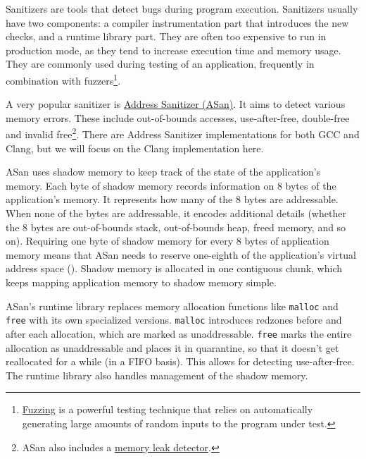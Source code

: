 \documentclass[
  a4paper,
]{report}
\begin{document}
\label{__index_entry_65}{Sanitizers}
are tools that detect bugs during program execution. Sanitizers usually
have two components: a compiler instrumentation part that introduces the
new checks, and a runtime library part. They are often too expensive to
run in production mode, as they tend to increase execution time and
memory usage. They are commonly used during testing of an application,
frequently in combination with
\label{__index_entry_66}{fuzzers}\footnote{\href{https://en.wikipedia.org/wiki/Fuzzing}{\label{__index_entry_67}{Fuzzing}}
  is a powerful testing technique that relies on automatically
  generating large amounts of random inputs to the program under test.}.

A very popular sanitizer is
\href{https://clang.llvm.org/docs/AddressSanitizer.html}{\label{__index_entry_68}{Address
Sanitizer (ASan)}}. It aims to detect
various memory errors. These include out-of-bounds accesses,
use-after-free, double-free and invalid free\footnote{ASan also includes
  a
  \href{https://clang.llvm.org/docs/LeakSanitizer.html}{\label{__index_entry_69}{memory
  leak detector}}.}. There are Address Sanitizer
implementations for both
\label{__index_entry_70}{GCC} and
\label{__index_entry_71}{Clang}, but we will
focus on the Clang implementation here.

ASan uses \label{__index_entry_72}{shadow
memory} to keep track of the state of the
application's memory. Each byte of shadow memory records information on
8 bytes of the application's memory. It represents how many of the 8
bytes are addressable. When none of the bytes are addressable, it
encodes additional details (whether the 8 bytes are out-of-bounds stack,
out-of-bounds heap, freed memory, and so on). Requiring one byte of
shadow memory for every 8 bytes of application memory means that ASan
needs to reserve one-eighth of the application's virtual address space
(). Shadow memory
is allocated in one contiguous chunk, which keeps mapping application
memory to shadow memory simple.

ASan's runtime library replaces memory allocation functions like
\label{__index_entry_73}{\texttt{malloc}}
and \label{__index_entry_74}{\texttt{free}}
with its own specialized versions. \texttt{malloc} introduces
\label{__index_entry_75}{redzones} before
and after each allocation, which are marked as unaddressable.
\texttt{free} marks the entire allocation as unaddressable and places it
in quarantine, so that it doesn't get reallocated for a while (in a FIFO
basis). This allows for detecting use-after-free. The runtime library
also handles management of the shadow memory.
\end{document}
